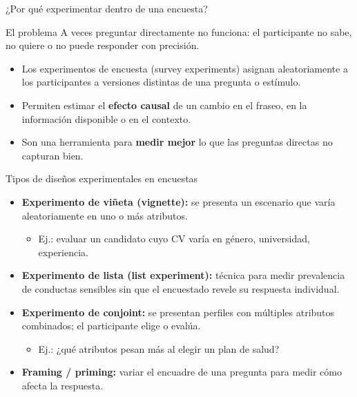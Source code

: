 \documentclass[aspectratio=169, 12pt]{beamer}
\begin{document}
\begin{frame}{¿Por qué experimentar dentro de una encuesta?}
  \begin{block}{El problema}
    A veces preguntar directamente no funciona: el participante no sabe, no quiere o no puede responder con precisión.
  \end{block}
  \vspace{0.4cm}
  \begin{itemize}
    \item Los \alert{experimentos de encuesta} (survey experiments) asignan aleatoriamente a los participantes a versiones distintas de una pregunta o estímulo.
    \item Permiten estimar el \textbf{efecto causal} de un cambio en el fraseo, en la información disponible o en el contexto.
    \item Son una herramienta para \textbf{medir mejor} lo que las preguntas directas no capturan bien.
  \end{itemize}
\end{frame}

\begin{frame}{Tipos de diseños experimentales en encuestas}
  \begin{itemize}
    \item \textbf{Experimento de viñeta (vignette):} se presenta un escenario que varía aleatoriamente en uno o más atributos.
    \begin{itemize}
      \item {\small Ej.: evaluar un candidato cuyo CV varía en género, universidad, experiencia.}
    \end{itemize}
    \item \textbf{Experimento de lista (list experiment):} técnica para medir prevalencia de conductas sensibles sin que el encuestado revele su respuesta individual.
    \item \textbf{Experimento de conjoint:} se presentan perfiles con múltiples atributos combinados; el participante elige o evalúa.
    \begin{itemize}
      \item {\small Ej.: ¿qué atributos pesan más al elegir un plan de salud?}
    \end{itemize}
    \item \textbf{Framing / priming:} variar el encuadre de una pregunta para medir cómo afecta la respuesta.
  \end{itemize}
\end{frame}
\end{document}
